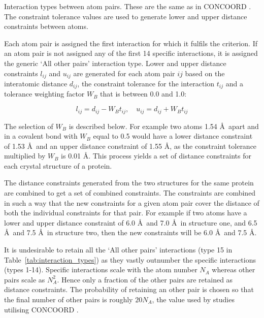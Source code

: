 \begin{table}
\centering


\caption{Interaction types between atom pairs.
These are the same as in CONCOORD \cite{DeGroot1997}.
The constraint tolerance values are used to generate lower and upper distance constraints between atoms.}

\label{tab:interaction_types}
\end{table}


Each atom pair is assigned the first interaction for which it fulfils the criterion.
If an atom pair is not assigned any of the first 14 specific interactions, it is assigned the generic `All other pairs' interaction type.
Lower and upper distance constraints $l_{ij}$ and $u_{ij}$ are generated for each atom pair $ij$ based on the interatomic distance $d_{ij}$, the constraint tolerance for the interaction $t_{ij}$ and a tolerance weighting factor $W_{B}$ that is between 0.0 and 1.0:

$$
l_{ij} = d_{ij} - W_{B} t_{ij}, \quad u_{ij} = d_{ij} + W_{B} t_{ij}
$$

The selection of $W_{B}$ is described below.
For example two atoms 1.54 \AA\ apart and in a covalent bond with $W_{B}$ equal to 0.5 would have a lower distance constraint of 1.53 \AA\ and an upper distance constraint of 1.55 \AA, as the constraint tolerance multiplied by $W_{B}$ is 0.01 \AA.
This process yields a set of distance constraints for each crystal structure of a protein.

The distance constraints generated from the two structures for the same protein are combined to get a set of combined constraints.
The constraints are combined in such a way that the new constraints for a given atom pair cover the distance of both the individual constraints for that pair.
For example if two atoms have a lower and upper distance constraint of 6.0 \AA\ and 7.0 \AA\ in structure one, and 6.5 \AA\ and 7.5 \AA\ in structure two, then the new constraints will be 6.0 \AA\ and 7.5 \AA.

It is undesirable to retain all the `All other pairs' interactions (type 15 in Table~\ref{tab:interaction_types}) as they vastly outnumber the specific interactions (types 1-14).
Specific interactions scale with the atom number $N_{A}$ whereas other pairs scale as $N_{A}^{2}$.
Hence only a fraction of the other pairs are retained as distance constraints.
The probability of retaining an other pair is chosen so that the final number of other pairs is roughly $20N_{A}$, the value used by studies utilising CONCOORD \cite{DeGroot1999}.

